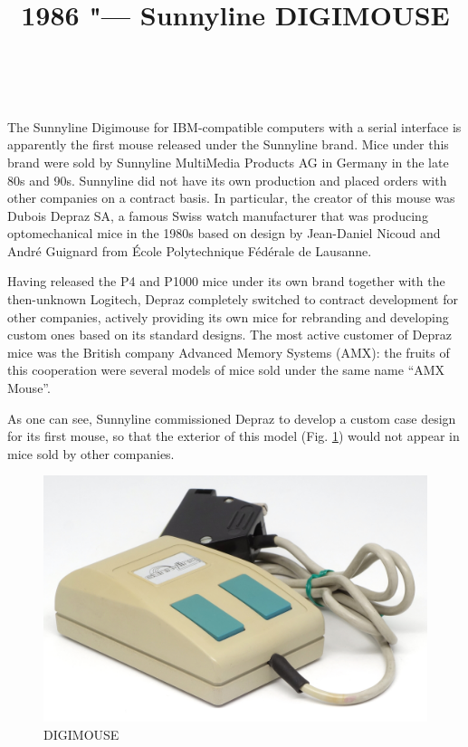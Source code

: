 \documentclass[11pt, a4paper]{article}
\begin{document}
\title{1986 "--- Sunnyline DIGIMOUSE}
\date{}
\author{~}
\maketitle
{}
The Sunnyline Digimouse for IBM-compatible computers with a serial interface is apparently the first mouse released under the Sunnyline brand.
Mice under this brand were sold by Sunnyline MultiMedia Products AG in Germany in the late 80s and 90s. Sunnyline did not have its own production and placed orders with other companies on a contract basis. In particular, the creator of this mouse was Dubois Depraz SA, a famous Swiss watch manufacturer that was producing optomechanical mice in the 1980s based on design by Jean-Daniel Nicoud and André Guignard from École Polytechnique Fédérale de Lausanne.

Having released the P4 and P1000 mice under its own brand together with the then-unknown Logitech, Depraz completely switched to contract development for other companies, actively providing its own mice for rebranding and developing custom ones based on its standard designs. The most active customer of Depraz mice was the British company Advanced Memory Systems (AMX): the fruits of this cooperation were several models of mice sold under the same name ``AMX Mouse''.

As one can see, Sunnyline commissioned Depraz to develop a custom case design for its first mouse, so that the exterior of this model (Fig. \ref{fig:SunnylineDIGIMOUSEPic}) would not appear in mice sold by other companies.

\begin{figure}[h]
   \centering
    \includegraphics[scale=0.8]{1986_sunnyline_digimouse/pic_30.jpg}
    \caption{DIGIMOUSE}
    \label{fig:SunnylineDIGIMOUSEPic}
\end{figure}
\end{document}
